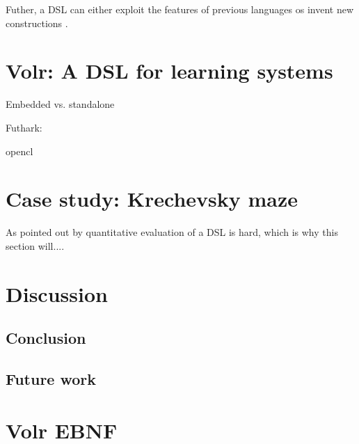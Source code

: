 \documentclass[a4paper,oneside]{memoir}
\begin{document}
Futher, a DSL can either exploit the features of previous languages os
invent new constructions \autocite{Mernik2005, Deursen2002}.

{\let\clearpage\relax\chapter{Volr: A DSL for learning systems}}
\label{volr}

Embedded vs. standalone

Futhark: \autocite{Henriksen2017}

\gls{opencl}

{\let\clearpage\relax\chapter{Case study: Krechevsky maze}}
\label{case}

As pointed out by \cite{Mernik2005} quantitative evaluation of a DSL is hard,
which is why this section will....

\chapter{Discussion}

\section{Conclusion}

\section{Future work}

\clearpage

\printglossary

\printbibliography

\newpage

\appendix
\chapter{Volr EBNF}
\label{ebnf}
\end{document}
